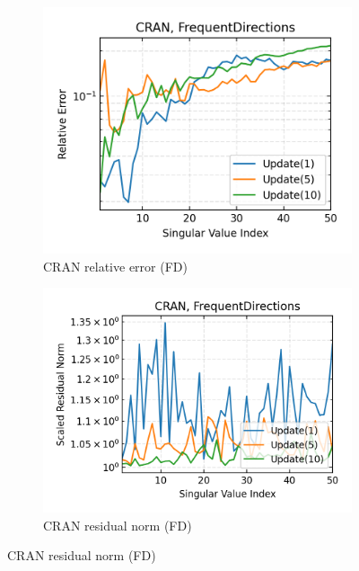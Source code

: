  \begin{figure}\ContinuedFloat
  \begin{subfigure}[b]{0.48\textwidth}
    \centering
    \includegraphics[width=\textwidth]{figures/cran/CRAN_frequent-directions_n_batches_10_k_dims_50_rel_err.png}
    \caption{CRAN relative error (FD)}
  \end{subfigure}
  \hfill
  \begin{subfigure}[b]{0.48\textwidth}
    \centering
    \includegraphics[width=\textwidth]{figures/cran/CRAN_frequent-directions_n_batches_10_k_dims_50_res_norm.png}
    \caption{CRAN residual norm (FD)}
  \end{subfigure}
\end{figure}